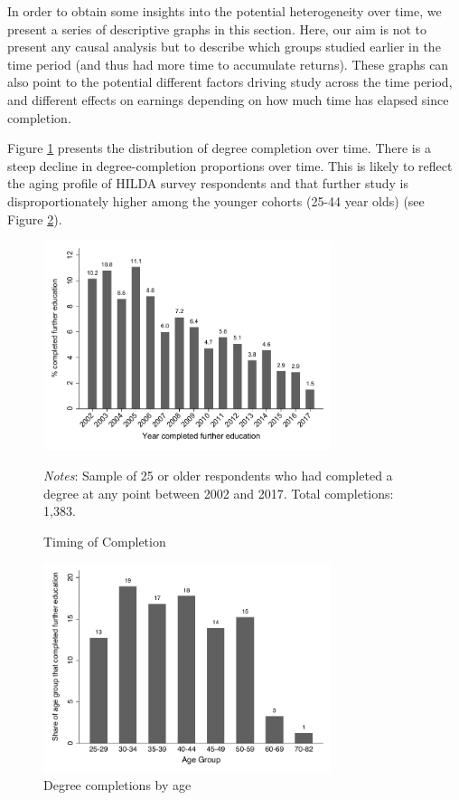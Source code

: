 \documentclass[12pt, a4paper]{article}
\begin{document}
In order to obtain some insights into the potential heterogeneity over time, we present a series of descriptive graphs in this section. Here, our aim is not to present any causal analysis but to describe which groups studied earlier in the time period (and thus had more time to accumulate returns). These graphs can also point to the potential different factors driving study across the time period, and different effects on earnings depending on how much time has elapsed since completion. 

Figure \ref{fig:yearcomp} presents the distribution of degree completion over time. There is a steep decline in degree-completion proportions over time. This is likely to reflect the aging profile of HILDA survey respondents and that further study is disproportionately higher among the younger cohorts (25-44 year olds) (see Figure \ref{fig:degbyage}).

\singlespacing
\begin{figure}[htbp]
\centering
\caption{Timing of Completion}
\vspace{0.5cm}
  \label{fig:yearcomp}
    \includegraphics[width=0.75\textwidth]{_figures/year_completed.pdf}
    \parbox{1\textwidth}{\footnotesize{\textit{Notes}: Sample of 25 or older respondents who had completed a degree at any point between 2002 and 2017. Total completions: 1,383.}}
\end{figure}

\begin{figure}[htbp]
\centering
\caption{Degree completions by age}
\vspace{0.5cm}
  \label{fig:degbyage}
    \includegraphics[width=0.75\textwidth]{_figures/descriptive_fig3b_bw.pdf}
\end{figure}
\doublespacing
\end{document}
